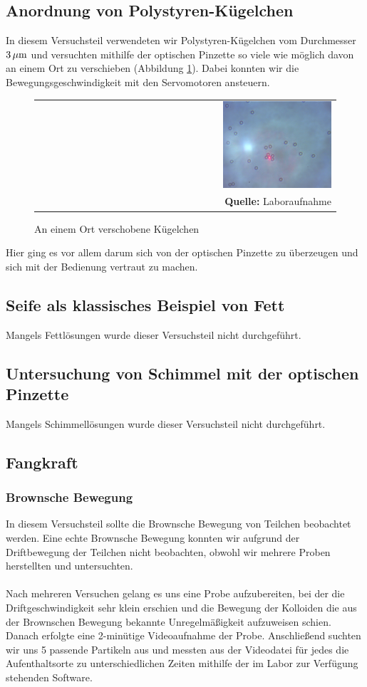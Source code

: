 \documentclass[a4paper,titlepage]{scrartcl}
\numberwithin{equation}{section}
\begin{document}
\subsection{Anordnung von Polystyren-Kügelchen}
In diesem Versuchsteil verwendeten wir Polystyren-Kügelchen vom Durchmesser $\unit[3]{\mu m}$ und versuchten mithilfe der optischen Pinzette so viele wie möglich davon an einem Ort zu verschieben (Abbildung \ref{fig:laboraufnahme3}). Dabei konnten wir die Bewegungsgeschwindigkeit mit den Servomotoren ansteuern.
\begin{figure}[H]
	\centering
	\begin{tabular}{@{}r@{}}
		\includegraphics[width=0.37\textwidth]{teilchengruppe.png}\\
		\footnotesize\sffamily\textbf{Quelle:} Laboraufnahme
	\end{tabular}
	\caption{An einem Ort verschobene Kügelchen}
    \label{fig:laboraufnahme3}
\end{figure}
Hier ging es vor allem darum sich von der optischen Pinzette zu überzeugen und sich mit der Bedienung vertraut zu machen.
\subsection{Seife als klassisches Beispiel von Fett}
Mangels Fettlösungen wurde dieser Versuchsteil nicht durchgeführt.
\subsection{Untersuchung von Schimmel mit der optischen Pinzette}
Mangels Schimmellösungen wurde dieser Versuchsteil nicht durchgeführt.
\subsection{Fangkraft}
\subsubsection{Brownsche Bewegung}
In diesem Versuchsteil sollte die Brownsche Bewegung von Teilchen beobachtet werden. Eine echte Brownsche Bewegung konnten wir aufgrund der Driftbewegung der Teilchen nicht beobachten, obwohl wir mehrere Proben herstellten und untersuchten.\\ \\
Nach mehreren Versuchen gelang es uns eine Probe aufzubereiten, bei der die Driftgeschwindigkeit sehr klein erschien und die Bewegung der Kolloiden die aus der Brownschen Bewegung bekannte Unregelmäßigkeit aufzuweisen schien. Danach erfolgte eine 2-minütige Videoaufnahme der Probe. Anschließend suchten wir uns 5 passende Partikeln aus und messten aus der Videodatei für jedes die Aufenthaltsorte zu unterschiedlichen Zeiten mithilfe der im Labor zur Verfügung stehenden Software.
\end{document}
